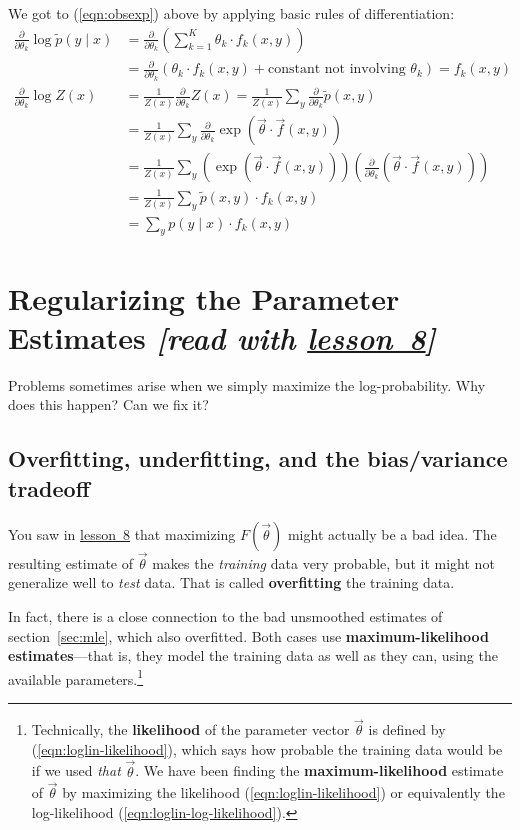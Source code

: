 \documentclass[11pt]{article}
\newcommand{\vtheta}{\vec{\theta}}
\newcommand{\ptilde}{\tilde{p}}
\newcommand{\diffk}{\frac{\partial}{\partial \theta_k}}
\newcommand{\lesson}[1]{\href{http://cs.jhu.edu/~jason/tutorials/loglin/\##1}{lesson~#1}}
\begin{document}
We got to (\ref{eqn:obsexp}) above by applying basic rules
of differentiation:
\begin{align}
  \diffk \log \ptilde(y \mid x)
  &= \diffk \left( \sum_{k=1}^K \theta_k \cdot f_k(x,y) \right) \\
  & = \diffk \left( \theta_k \cdot f_k(x,y) + \textrm{constant not involving $\theta_k$} \right) = f_k(x,y)\\
%
  \diffk \log Z(x) &= \frac{1}{Z(x)} \diffk Z(x)
  = \frac{1}{Z(x)} \sum_y \diffk \ptilde(x,y)  \\
  &= \frac{1}{Z(x)} \sum_y \diffk \exp (\vtheta \cdot \vec{f}(x,y))\\
  &= \frac{1}{Z(x)} \sum_y \left( \exp (\vtheta \cdot \vec{f}(x,y)) \right)
  \left( \diffk (\vtheta \cdot \vec{f}(x,y)) \right) \\
  &= \frac{1}{Z(x)} \sum_y \ptilde(x,y) \cdot f_k(x,y) \\
  &= \sum_y p(y\mid x) \cdot f_k(x,y)
\end{align}

\section{Regularizing the Parameter Estimates {\em [read with \lesson{8}]}}

Problems sometimes arise when we simply maximize the log-probability.
Why does this happen?  Can we fix it?

\subsection{Overfitting, underfitting, and the bias/variance tradeoff}

You saw in \lesson{8} that maximizing $F(\vtheta)$ might actually be a
bad idea.  The resulting estimate of $\vtheta$ makes the {\em
  training} data very probable, but it might not generalize well to
{\em test} data.  That is called {\bf overfitting} the training data.

In fact, there is a close connection to the bad unsmoothed estimates
of section~\ref{sec:mle}, which also overfitted.  Both cases use {\bf
  maximum-likelihood estimates}---that is, they model the training
data as well as they can, using the available
parameters.\footnote{Technically, the {\bf likelihood} of the
  parameter vector $\vtheta$ is defined by
  (\ref{eqn:loglin-likelihood}), which says how probable the training
  data would be if we used {\em that} $\vtheta$.  We have been finding
  the {\bf maximum-likelihood} estimate of $\vtheta$ by maximizing the
  likelihood (\ref{eqn:loglin-likelihood}) or equivalently the
  log-likelihood (\ref{eqn:loglin-log-likelihood}).}
\end{document}
